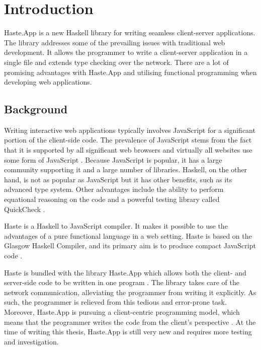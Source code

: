 \documentclass[a4paper]{article}
\begin{document}
\newpage
\tableofcontents

\newpage

\glsaddall

\printnoidxglossary


\newpage
{}


\section{Introduction}
Haste.App is a new Haskell library for writing seamless client-server applications. The library addresses some of the prevailing issues with traditional web development. It allows the programmer to write a client-server application in a single file and extends type checking over the network. There are a lot of promising advantages with Haste.App and utilising functional programming when developing web applications.

\subsection{Background}
Writing interactive web applications typically involves JavaScript for a significant portion of the client-side code. The prevalence of JavaScript stems from the fact that it is supported by all significant web browsers and virtually all websites use some form of JavaScript \cite{flanagan2011javascript}. Because JavaScript is popular, it has a large community supporting it and a large number of libraries. Haskell, on the other hand, is not as popular as JavaScript but it has other benefits, such as its advanced type system. Other advantages include the ability to perform equational reasoning on the code \cite{gibbons2011just} and a powerful testing library called QuickCheck \cite{Claessen:2011:QLT:1988042.1988046}.

Haste is a Haskell to JavaScript compiler. It makes it possible to use the advantages of a pure functional language in a web setting. Haste is based on the Glasgow Haskell Compiler, and its primary aim is to produce compact JavaScript code \cite{a-distributed-haskell-for-the-modern-web}.

Haste is bundled with the library Haste.App which allows both the client- and server-side code to be written in one program \cite{ekblad2015seamless}. The library takes care of the network communication, alleviating the programmer from writing it explicitly. As such, the programmer is relieved from this tedious and error-prone task. Moreover, Haste.App is  pursuing a client-centric programming model, which means that the programmer writes the code from the client's perspective \cite{a-distributed-haskell-for-the-modern-web}. At the time of writing this thesis, Haste.App is still very new and requires more testing and investigation.
\end{document}
